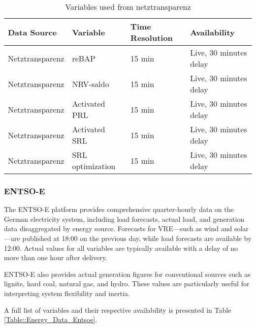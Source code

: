 \documentclass[class=scrbook, crop=false]{standalone}
\begin{document}
\begin{table}[]
\centering
\begin{tabular}{l|l|l|l}
 Data Source & Variable &  Time Resolution & Availability  \\\hline
 Netztransparenz & reBAP & 15 min & Live, 30 minutes delay \\
 Netztransparenz & NRV-saldo & 15 min & Live, 30 minutes delay \\
 Netztransparenz & Activated PRL & 15 min &Live, 30 minutes delay \\
 Netztransparenz & Activated SRL & 15 min & Live, 30 minutes delay \\
 Netztransparenz & SRL optimization & 15 min & Live, 30 minutes delay \\

\end{tabular}
\caption{Variables used from netztransparenz}
\label{Table::Energy_Data_Netztransparenz}
\end{table}

\subsubsection{ENTSO-E}

The \gls{ENTSO-E} platform provides comprehensive quarter-hourly data on the German electricity system, including load forecasts, actual load, and generation data disaggregated by energy source. Forecasts for \gls{VRE}—such as wind and solar—are published at 18:00 on the previous day, while load forecasts are available by 12:00. Actual values for all variables are typically available with a delay of no more than one hour after delivery.

\gls{ENTSO-E} also provides actual generation figures for conventional sources such as lignite, hard coal, natural gas, and hydro. These values are particularly useful for interpreting system flexibility and inertia.

A full list of variables and their respective availability is presented in Table \ref{Table::Energy_Data_Entsoe}.





\end{document}
